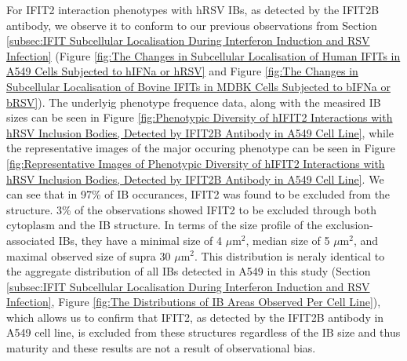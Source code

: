 For IFIT2 interaction phenotypes with hRSV IBs, as detected by the IFIT2B antibody, we observe it to conform to our previous observations from Section \ref{subsec:IFIT Subcellular Localisation During Interferon Induction and RSV Infection} (Figure \ref{fig:The Changes in Subcellular Localisation of Human IFITs in A549 Cells Subjected to hIFNa or hRSV} and Figure \ref{fig:The Changes in Subcellular Localisation of Bovine IFITs in MDBK Cells Subjected to bIFNa or bRSV}). The underlyig phenotype frequence data, along with the measired IB sizes can be seen in Figure \ref{fig:Phenotypic Diversity of hIFIT2 Interactions with hRSV Inclusion Bodies, Detected by IFIT2B Antibody in A549 Cell Line}, while the representative images of the major occuring phenotype can be seen in Figure \ref{fig:Representative Images of Phenotypic Diversity of hIFIT2 Interactions with hRSV Inclusion Bodies, Detected by IFIT2B Antibody in A549 Cell Line}. We can see that in 97\% of IB occurances, IFIT2 was found to be excluded from the structure. 3\% of the observations showed IFIT2 to be excluded through both cytoplasm and the IB structure. In terms of the size profile of the exclusion-associated IBs, they have a minimal size of 4 \(\mu \mbox{m}^2\), median size of 5 \(\mu \mbox{m}^2\), and maximal observed size of supra 30 \(\mu \mbox{m}^2\). This distribution is neraly identical to the aggregate distribution of all IBs detected in A549 in this study (Section \ref{subsec:IFIT Subcellular Localisation During Interferon Induction and RSV Infection}, Figure \ref{fig:The Distributions of IB Areas Observed Per Cell Line}), which allows us to confirm that IFIT2, as detected by the IFIT2B antibody in A549 cell line, is excluded from these structures regardless of the IB size and thus maturity and these results are not a result of observational bias.

